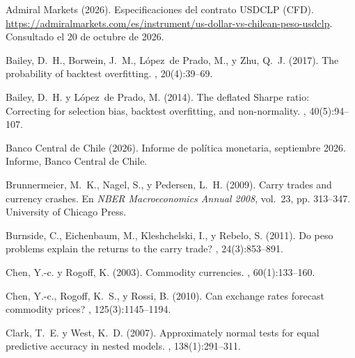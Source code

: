 \documentclass[11pt,a4paper]{article}
\begin{document}
\newpage
\renewcommand{\refname}{Referencias}
\begin{thebibliography}{}

{Admiral Markets} (2026).
\newblock Especificaciones del contrato {USDCLP} ({CFD}).
\newblock \url{https://admiralmarkets.com/es/instrument/us-dollar-vs-chilean-peso-usdclp}. Consultado el 20 de octubre de 2026.

Bailey, D.~H., Borwein, J.~M., López~de Prado, M., y Zhu, Q.~J. (2017).
\newblock The probability of backtest overfitting.
, 20(4):39--69.

Bailey, D.~H. y López~de Prado, M. (2014).
\newblock The deflated {S}harpe ratio: Correcting for selection bias, backtest
  overfitting, and non-normality.
, 40(5):94--107.

{Banco Central de Chile} (2026).
\newblock Informe de política monetaria, septiembre 2026.
\newblock Informe, Banco Central de Chile.

Brunnermeier, M.~K., Nagel, S., y Pedersen, L.~H. (2009).
\newblock Carry trades and currency crashes.
\newblock En {\em NBER Macroeconomics Annual 2008}, vol.~23, pp. 313--347.
  University of Chicago Press.

Burnside, C., Eichenbaum, M., Kleshchelski, I., y Rebelo, S. (2011).
\newblock Do peso problems explain the returns to the carry trade?
, 24(3):853--891.

Chen, Y.-c. y Rogoff, K. (2003).
\newblock Commodity currencies.
, 60(1):133--160.

Chen, Y.-c., Rogoff, K.~S., y Rossi, B. (2010).
\newblock Can exchange rates forecast commodity prices?
, 125(3):1145--1194.

Clark, T.~E. y West, K.~D. (2007).
\newblock Approximately normal tests for equal predictive accuracy in nested
  models.
, 138(1):291--311.


\end{thebibliography}
\end{document}
